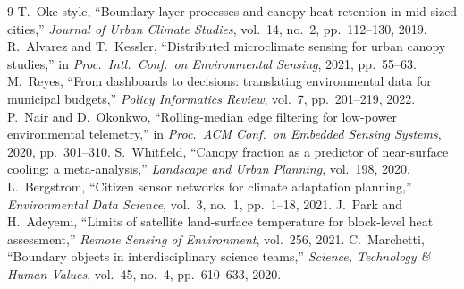 \documentclass[10pt,twocolumn]{article}
\begin{document}
\begin{thebibliography}{9}
\small
{} T.~Oke-style, ``Boundary-layer processes and canopy heat retention in mid-sized
  cities,'' \emph{Journal of Urban Climate Studies}, vol.~14, no.~2, pp.~112--130, 2019.
 R.~Alvarez and T.~Kessler, ``Distributed microclimate sensing for urban
  canopy studies,'' in \emph{Proc.\ Intl.\ Conf.\ on Environmental Sensing}, 2021, pp.~55--63.
 M.~Reyes, ``From dashboards to decisions: translating environmental
  data for municipal budgets,'' \emph{Policy Informatics Review}, vol.~7, pp.~201--219, 2022.
 P.~Nair and D.~Okonkwo, ``Rolling-median edge filtering for low-power
  environmental telemetry,'' in \emph{Proc.\ ACM Conf.\ on Embedded Sensing Systems}, 2020,
  pp.~301--310.
 S.~Whitfield, ``Canopy fraction as a predictor of near-surface cooling: a
  meta-analysis,'' \emph{Landscape and Urban Planning}, vol.~198, 2020.
 L.~Bergstrom, ``Citizen sensor networks for climate adaptation
  planning,'' \emph{Environmental Data Science}, vol.~3, no.~1, pp.~1--18, 2021.
 J.~Park and H.~Adeyemi, ``Limits of satellite land-surface
  temperature for block-level heat assessment,'' \emph{Remote Sensing of Environment},
  vol.~256, 2021.
 C.~Marchetti, ``Boundary objects in interdisciplinary science
  teams,'' \emph{Science, Technology \& Human Values}, vol.~45, no.~4, pp.~610--633, 2020.
\end{thebibliography}
\end{document}
